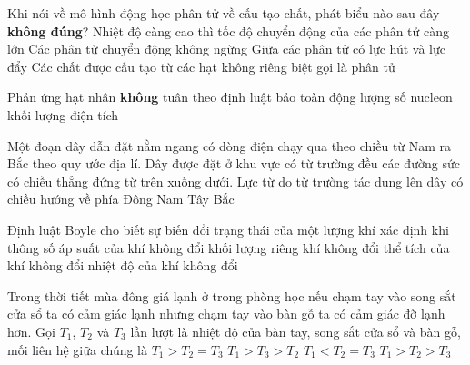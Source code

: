 	\begin{ex}%
		Khi nói về mô hình động học phân tử về cấu tạo chất, phát biểu nào sau đây \textbf{không đúng}?
		\choice
		{Nhiệt độ càng cao thì tốc độ chuyển động của các phân tử càng lớn}
		{Các phân tử chuyển động không ngừng}
		{Giữa các phân tử có lực hút và lực đẩy}
		{\True Các chất được cấu tạo từ các hạt không riêng biệt gọi là phân tử}
	\end{ex}

	\begin{ex}%
		Phản ứng hạt nhân \textbf{không} tuân theo định luật bảo toàn
		\choice
		{động lượng}
		{số nucleon}
		{\True khối lượng}
		{điện tích}
	\end{ex}

	\begin{ex}%
		Một đoạn dây dẫn đặt nằm ngang có dòng điện chạy qua theo chiều từ Nam ra Bắc theo quy ước địa lí. Dây được đặt ở khu vực có từ trường đều các đường sức có chiều thẳng đứng từ trên xuống dưới. Lực từ do từ trường tác dụng lên dây có chiều hướng về phía
		\choice
		{Đông}
		{Nam}
		{\True Tây}
		{Bắc}
	\end{ex}

	\begin{ex}%
		Định luật Boyle cho biết sự biến đổi trạng thái của một lượng khí xác định khi thông số
		\choice
		{áp suất của khí không đổi}
		{khối lượng riêng khí không đổi}
		{thể tích của khí không đổi}
		{\True nhiệt độ của khí không đổi}
	\end{ex}

	\begin{ex}%
		Trong thời tiết mùa đông giá lạnh ở trong phòng học nếu chạm tay vào song sắt cửa sổ ta có cảm giác lạnh nhưng chạm tay vào bàn gỗ ta có cảm giác đỡ lạnh hơn. Gọi $T_1$, $T_2$ và $T_3$ lần lượt là nhiệt độ của bàn tay, song sắt cửa sổ và bàn gỗ, mối liên hệ giữa chúng là
		\choice
		{\True $T_1>T_2=T_3$}
		{$T_1>T_3>T_2$}
		{$T_1<T_2=T_3$}
		{$T_1>T_2>T_3$}
	\end{ex}

